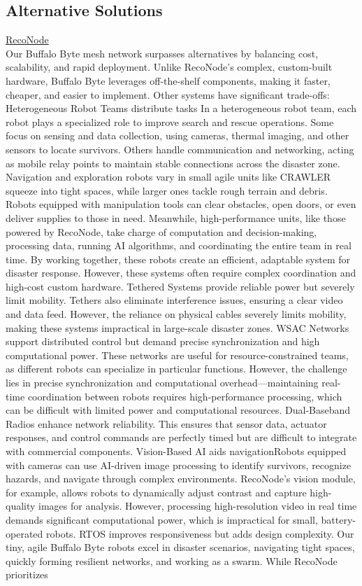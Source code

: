 \documentclass[10pt]{article}
\begin{document}
\subsection*{Alternative Solutions}
\underline{RecoNode} \cite{RecoNode}\\[0.2\baselineskip]
Our Buffalo Byte mesh network surpasses alternatives by balancing cost, scalability, and rapid deployment. Unlike RecoNode’s complex, custom-built hardware, Buffalo Byte leverages off-the-shelf components, making it faster, cheaper, and easier to implement. Other systems have significant trade-offs: Heterogeneous Robot Teams distribute tasks In a heterogeneous robot team, each robot plays a specialized role to improve search and rescue operations. Some focus on sensing and data collection, using cameras, thermal imaging, and other sensors to locate survivors. Others handle communication and networking, acting as mobile relay points to maintain stable connections across the disaster zone. Navigation and exploration robots vary in small agile units like CRAWLER squeeze into tight spaces, while larger ones tackle rough terrain and debris. Robots equipped with manipulation tools can clear obstacles, open doors, or even deliver supplies to those in need. Meanwhile, high-performance units, like those powered by RecoNode, take charge of computation and decision-making, processing data, running AI algorithms, and coordinating the entire team in real time. By working together, these robots create an efficient, adaptable system for disaster response. However, these systems often require complex coordination and high-cost custom hardware. Tethered Systems provide reliable power but severely limit mobility. Tethers also eliminate interference issues, ensuring a clear video and data feed. However, the reliance on physical cables severely limits mobility, making these systems impractical in large-scale disaster zones. WSAC Networks support distributed control but demand precise synchronization and high computational power. These networks are useful for resource-constrained teams, as different robots can specialize in particular functions. However, the challenge lies in precise synchronization and computational overhead—maintaining real-time coordination between robots requires high-performance processing, which can be difficult with limited power and computational resources. Dual-Baseband Radios enhance network reliability. This ensures that sensor data, actuator responses, and control commands are perfectly timed but are difficult to integrate with commercial components. Vision-Based AI aids navigationRobots equipped with cameras can use AI-driven image processing to identify survivors, recognize hazards, and navigate through complex environments. RecoNode’s vision module, for example, allows robots to dynamically adjust contrast and capture high-quality images for analysis. However, processing high-resolution video in real time demands significant computational power, which is impractical for small, battery-operated robots. RTOS improves responsiveness but adds design complexity. Our tiny, agile Buffalo Byte robots excel in disaster scenarios, navigating tight spaces, quickly forming resilient networks, and working as a swarm. While RecoNode prioritizes 
\end{document}
